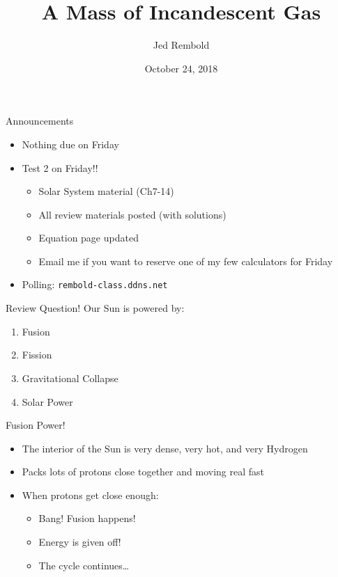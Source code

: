 \documentclass[pdf, aspectratio=169]{beamer}
\title{A Mass of Incandescent Gas}
\author{Jed Rembold}
\date{October 24, 2018}
\begin{document}
\renewcommand{\theenumi}{\Alph{enumi}}

\begin{frame}{Announcements}
	\begin{itemize}
		\item Nothing due on Friday
		\item Test 2 on Friday!!
			\begin{itemize}
				\item Solar System material (Ch7-14)
				\item All review materials posted (with solutions)
				\item Equation page updated
				\item Email me if you want to reserve one of my few calculators for Friday 			\end{itemize}
		\item Polling: \nolinkurl{rembold-class.ddns.net}
	\end{itemize}
\end{frame}


\begin{frame}{Review Question!}
  Our Sun is powered by:
  \begin{enumerate}
	\item \alert<2>{Fusion}
	\item Fission
	\item Gravitational Collapse
	\item Solar Power
  \end{enumerate}
\end{frame}

\begin{frame}{Fusion Power!}
  \begin{itemize}
	\item The interior of the Sun is very dense, very hot, and very Hydrogen
	\item Packs lots of protons close together and moving real fast
	\item When protons get close enough:
	  \begin{itemize}
		\item Bang! Fusion happens!
		\item Energy is given off!
		\item The cycle continues\ldots
	  \end{itemize}
  \end{itemize}
\end{frame}
\end{document}
